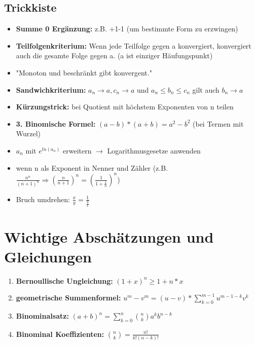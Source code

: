 \documentclass[a4paper,12pt]{article} %
\begin{document}
\subsection{Trickkiste}
\begin{itemize}
\item \textbf{Summe 0 Ergänzung:} z.B. +1-1 (um bestimmte Form zu erzwingen)
\item \textbf{Teilfolgenkriterium:} Wenn jede Teilfolge gegen a konvergiert, konvergiert auch die gesamte Folge gegen a. (a ist einziger Häufungspunkt)
\item "Monoton und beschränkt gibt konvergent."
\item \textbf{Sandwichkriterium:} $a_n \rightarrow a, c_n \rightarrow a$ und $a_n \leq b_n \leq c_n$ gilt auch $b_n \rightarrow a$
\item \textbf{Kürzungstrick:} bei Quotient mit höchstem Exponenten von n teilen
\item \textbf{3. Binomische Formel:} $(a-b)*(a+b) = a^2-b^2$ (bei Termen mit Wurzel)
\item $a_n$ mit $e^{ln(a_n)}$ erweitern $\rightarrow$ Logarithmusgesetze anwenden
\item wenn n als Exponent in Nenner und Zähler (z.B. $\frac{n^n}{(n+1)^n} \Rightarrow (\frac{n}{n+1})^n = (\frac{1}{1+\frac{1}{n}})^n$)
\item Bruch umdrehen: $\frac{x}{y} = \frac{1}{\frac{y}{x}}$
\end{itemize}
\section{Wichtige Abschätzungen und Gleichungen}
\begin{enumerate}
\item \textbf{Bernoullische Ungleichung:} $(1+x)^n \geq 1+n*x$
\item \textbf{geometrische Summenformel:} $u^m-v^m = (u-v)*\sum_{k=0}^{m-1}u^{m-1-k}  v^k$
\item \textbf{Binominalsatz:} $(a+b)^n=\sum_{k=0}^{n} {n \choose k} a^kb^{n-k}$
\item \textbf{Binominal Koeffizienten:} ${n \choose k} = \frac{n!}{k!(n-k)!}$
\end{enumerate}
\end{document}
